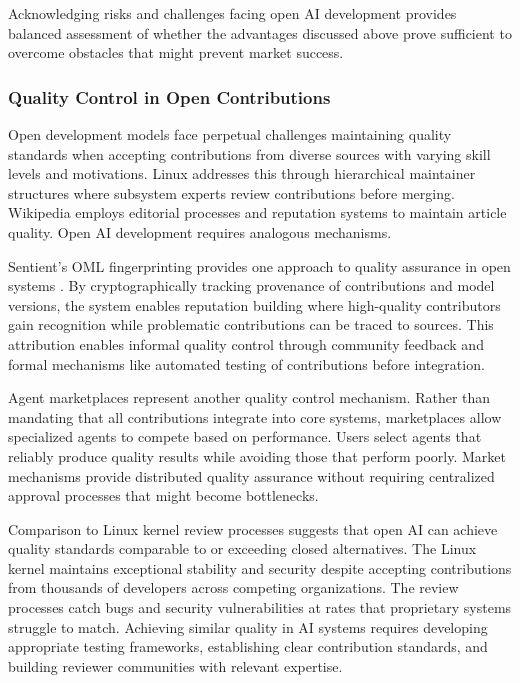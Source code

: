 Acknowledging risks and challenges facing open AI development provides balanced assessment of whether the advantages discussed above prove sufficient to overcome obstacles that might prevent market success.

\subsubsection{Quality Control in Open Contributions}

Open development models face perpetual challenges maintaining quality standards when accepting contributions from diverse sources with varying skill levels and motivations. Linux addresses this through hierarchical maintainer structures where subsystem experts review contributions before merging. Wikipedia employs editorial processes and reputation systems to maintain article quality. Open AI development requires analogous mechanisms.

Sentient's OML fingerprinting provides one approach to quality assurance in open systems \cite{oml_github2025}. By cryptographically tracking provenance of contributions and model versions, the system enables reputation building where high-quality contributors gain recognition while problematic contributions can be traced to sources. This attribution enables informal quality control through community feedback and formal mechanisms like automated testing of contributions before integration.

Agent marketplaces represent another quality control mechanism. Rather than mandating that all contributions integrate into core systems, marketplaces allow specialized agents to compete based on performance. Users select agents that reliably produce quality results while avoiding those that perform poorly. Market mechanisms provide distributed quality assurance without requiring centralized approval processes that might become bottlenecks.

Comparison to Linux kernel review processes suggests that open AI can achieve quality standards comparable to or exceeding closed alternatives. The Linux kernel maintains exceptional stability and security despite accepting contributions from thousands of developers across competing organizations. The review processes catch bugs and security vulnerabilities at rates that proprietary systems struggle to match. Achieving similar quality in AI systems requires developing appropriate testing frameworks, establishing clear contribution standards, and building reviewer communities with relevant expertise.

